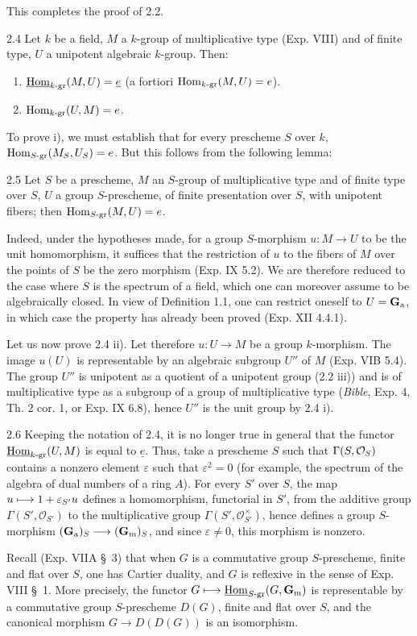 This completes the proof of 2.2.
\begin{proposition}{2.4}\label{XVII.2.4}
Let $k$ be a field, $M$ a $k$-group of multiplicative type (Exp. VIII) and of finite type, $U$ a unipotent algebraic $k$-group. Then:
\begin{enumerate}[label=\textup{\roman*)}]
\item $\underline{\operatorname{Hom}}_{k\text{-gr}}(M,U)=\underline e$ (a fortiori $\operatorname{Hom}_{k\text{-gr}}(M,U)=e$).
\item $\operatorname{Hom}_{k\text{-gr}}(U,M)=e$.
\end{enumerate}
\end{proposition}
To prove i), we must establish that for every prescheme $S$ over $k$, $\operatorname{Hom}_{S\text{-gr}}(M_S,U_S)=e$. But this follows from the following lemma:
\begin{lemma}{2.5}\label{XVII.2.5}
Let $S$ be a prescheme, $M$ an $S$-group of multiplicative type and of finite type over $S$, $U$ a group $S$-prescheme, of finite presentation over $S$, with unipotent fibers; then $\operatorname{Hom}_{S\text{-gr}}(M,U)=e$.
\end{lemma}
Indeed, under the hypotheses made, for a group $S$-morphism $u:M\to U$ to be the unit homomorphism, it suffices that the restriction of $u$ to the fibers of $M$ over the points of $S$ be the zero morphism (Exp. IX 5.2). We are therefore reduced to the case where $S$ is the spectrum of a field, which one can moreover assume to be algebraically closed. In view of Definition 1.1, one can restrict oneself to $U=\mathbf{G}_{\mathrm{a}}$, in which case the property has already been proved (Exp. XII 4.4.1).

Let us now prove 2.4 ii). Let therefore $u:U\to M$ be a group $k$-morphism. The image $u(U)$ is representable by an algebraic subgroup $U''$ of $M$ (Exp. VIB 5.4). The group $U''$ is unipotent as a quotient of a unipotent group (2.2 iii)) and is of multiplicative type as a subgroup of a group of multiplicative type (\cf \emph{Bible}, Exp. 4, Th. 2 cor. 1, or Exp. IX 6.8), hence $U''$ is the unit group by 2.4 i).

\begin{remark}{2.6}\label{XVII.2.6}
Keeping the notation of 2.4, it is no longer true in general that the functor $\underline{\operatorname{Hom}}_{k\text{-gr}}(U,M)$ is equal to $\underline e$. Thus, take a prescheme $S$ such that $\Gamma(S,\mathcal{O}_S)$ contains a nonzero element $\varepsilon$ such that $\varepsilon^2=0$ (for example, the spectrum of the algebra of dual numbers of a ring $A$). For every $S'$ over $S$, the map $u\longmapsto1+\varepsilon_{S'}u$ defines a homomorphism, functorial in $S'$, from the additive group $\Gamma(S',\mathcal O_{S'})$ to the multiplicative group $\Gamma(S',\mathcal O_{S'}^\times)$, hence defines a group $S$-morphism $(\mathbf{G}_{\mathrm{a}})_S\longrightarrow(\mathbf{G}_{\mathrm{m}})_S$, and since $\varepsilon\neq0$, this morphism is nonzero.
\end{remark}
Recall (Exp. VIIA \S~3) that when $G$ is a commutative group $S$-prescheme, finite and flat over $S$, one has Cartier duality, and $G$ is reflexive in the sense of Exp. VIII \S~1. More precisely, the functor $G\longmapsto\underline{\operatorname{Hom}}_{S\text{-gr}}(G,\mathbf{G}_{\mathrm{m}})$ is representable by a commutative group $S$-prescheme $D(G)$, finite and flat over $S$, and the canonical morphism $G\to D(D(G))$ is an isomorphism.
